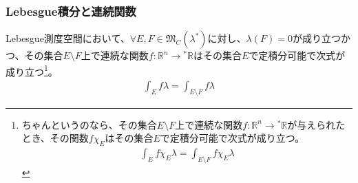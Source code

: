 \documentclass[dvipdfmx]{jsarticle}
\begin{document}
\subsubsection{Lebesgue積分と連続関数}%
\begin{thm}\label{4.6.6.5}
Lebesgue測度空間において、$\forall E,F \in \mathfrak{M}_{C}\left( \lambda^{*} \right)$に対し、$\lambda(F) = 0$が成り立つかつ、その集合$E \setminus F$上で連続な関数$f:\mathbb{R}^{n} \rightarrow{}^{*}\mathbb{R}$はその集合$E$で定積分可能で次式が成り立つ\footnote{ちゃんというのなら、その集合$E \setminus F$上で連続な関数$f:\mathbb{R}^{n} \rightarrow{}^{*}\mathbb{R}$が与えられたとき、その関数$f\chi_{E}$はその集合$E$で定積分可能で次式が成り立つ。
\begin{align*}
\int_{E} {f\chi_{E}\lambda} = \int_{E \setminus F} {f\chi_{E}\lambda}
\end{align*}}。
\begin{align*}
\int_{E} {f\lambda} = \int_{E \setminus F} {f\lambda}
\end{align*}
\end{thm}
\end{document}
